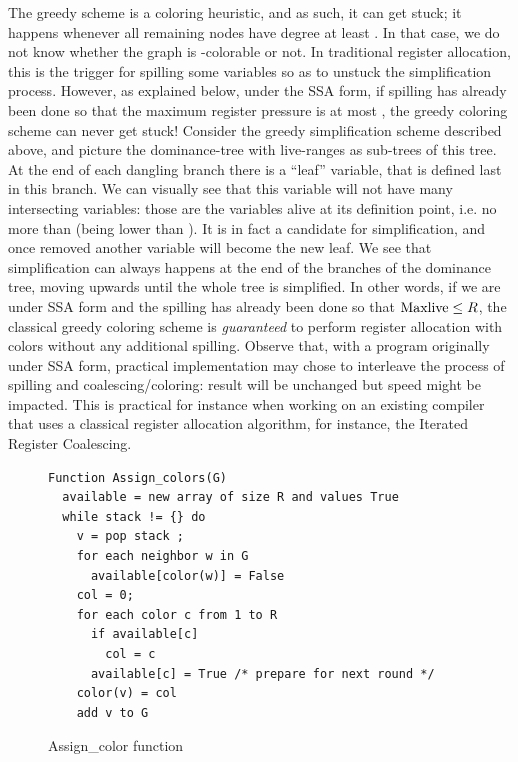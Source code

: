 {The greedy scheme is a coloring heuristic, and as such, it can get stuck;
it happens whenever all remaining nodes have degree at least \regs.
In that case, we do not know whether the graph is \regs-colorable or not.
In traditional register allocation, this is the trigger for spilling some variables so as to unstuck the simplification process.
However, as explained below, under the SSA form, if spilling has already been done so that the maximum register pressure is at most \regs, the greedy coloring scheme can never get stuck!
Consider the greedy simplification scheme described above, and picture the dominance-tree with live-ranges as sub-trees of this tree.
At the end of each dangling branch there is a ``leaf'' variable, that is defined last in this branch.
We can visually see that this variable will not have many intersecting variables:
those are the variables alive at its definition point, i.e. no more than  (\maxlive being lower than \regs).
It is in fact a candidate for simplification, and once removed another variable will become the new leaf.
We see that simplification can always happens at the end of the branches of the dominance tree, moving upwards until the whole tree is simplified.
In other words, if we are under SSA form and the spilling has already been done so that $\mathrm{Maxlive} \leq R$, the classical greedy coloring scheme is \emph{guaranteed} to perform register allocation with \regs colors without any additional spilling.
Observe that, with a program originally under SSA form, practical implementation may chose to interleave the process of spilling and coalescing/coloring:
result will be unchanged but speed might be impacted.
This is practical for instance when working on an existing compiler that uses a classical register allocation algorithm, for instance, the Iterated Register Coalescing.



\begin{figure}
\begin{verbatim}
Function Assign_colors(G)
  available = new array of size R and values True
  while stack != {} do
    v = pop stack ;
    for each neighbor w in G
      available[color(w)] = False
    col = 0;
    for each color c from 1 to R
      if available[c]
        col = c
      available[c] = True /* prepare for next round */
    color(v) = col
    add v to G
\end{verbatim}
\caption{Assign\_color function}
\label{ra:code:assign-color}
\end{figure}


}
